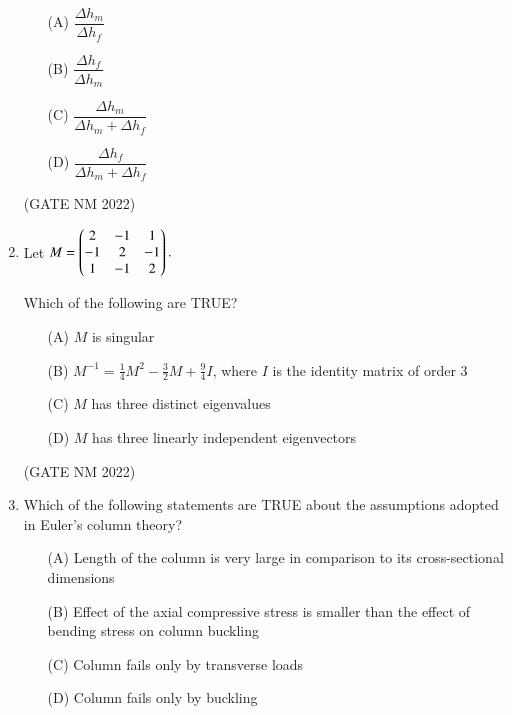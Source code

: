 \documentclass[journal,12pt,onecolumn]{IEEEtran}
\theoremstyle{remark}
\begin{document}
\begin{enumerate}
	\begin{multicols}{4}

\begin{enumerate}
    \item[(A)] $\dfrac{\Delta h_m}{ \Delta h_f}$
    \item[(B)] $\dfrac{\Delta h_f}{\Delta h_m }$
    \item[(C)] $\dfrac{\Delta h_m }{\Delta h_m + \Delta h_f}$
    \item[(D)] $\dfrac{\Delta h_f }{\Delta h_m + \Delta h_f}$
\end{enumerate}

	\end{multicols}

\hfill(GATE NM 2022)



\item  Let  
$M=
\begin{pmatrix}2 & -1 & 1 \\
-1 & 2 & -1 \\
1 & -1 & 2\end{pmatrix}.
$  

Which of the following are TRUE?

\begin{enumerate}
    \item[(A)] $M$ is singular
    \item[(B)] $M^{-1} = {\frac{1}{4}}M^{2} - {\frac{3}{2}}M + {\frac{9}{4}}I $, where $I$ is the identity matrix of order 3
    \item[(C)] $M$ has three distinct eigenvalues
    \item[(D)] $M$ has three linearly independent eigenvectors
\end{enumerate}

\hfill(GATE NM 2022)












\item  Which of the following statements are TRUE about the assumptions adopted in Euler's column theory?  

\begin{enumerate}
    \item[(A)] Length of the column is very large in comparison to its cross-sectional dimensions
    \item[(B)] Effect of the axial compressive stress is smaller than the effect of bending stress on column buckling
    \item[(C)] Column fails only by transverse loads
    \item[(D)] Column fails only by buckling
\end{enumerate}


\end{enumerate}
\end{document}

